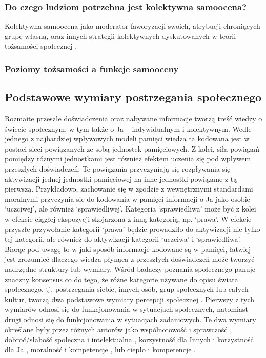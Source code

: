 \documentclass[man]{apa6}
\begin{document}
\subsubsection{Do czego ludziom potrzebna jest kolektywna samoocena?}

Kolektywna samoocena jako moderator faworyzacji swoich, atrybucji chroniących grupę własną, oraz innych strategii kolektywnych dyskutowanych w teorii tożsamości społecznej \parencite{crocker1990collective, luhtanen1992collective}.

\subsubsection{Poziomy tożsamości a funkcje samooceny}



\newpage
\subsection{Podstawowe wymiary postrzegania społecznego}

Rozmaite przeszłe doświadczenia oraz nabywane informacje tworzą treść wiedzy o świecie społecznym, w tym także o Ja -- indywidualnym i kolektywnym. Wedle jednego z najbardziej wpływowych modeli pamięci \parencite{anderson1983spreading} wiedza ta kodowana jest w postaci sieci powiązanych ze sobą jednostek pamięciowych. Z kolei, siła powiązań pomiędzy różnymi jednostkami jest również efektem uczenia się pod wpływem przeszłych doświadczeń. Te powiązania przyczyniają się rozpływania się aktywizacji jednej jednostki pamięciowej na inne jednostki powiązane z tą pierwszą. Przykładowo, zachowanie się w zgodzie z wewnętrznymi standardami moralnymi przyczynia się do kodowania w pamięci informacji o Ja jako osobie `uczciwej', ale również `sprawiedliwej'. Kategoria `sprawiedliwa' może być z kolei w efekcie ciągłej ekspozycji skojarzona z inną kategorią, np. `prawa'. W efekcie przyszłe przywołanie kategorii `prawa' będzie prowadziło do aktywizacji nie tylko tej kategorii, ale również do aktywizacji kategorii `uczciwa' i `sprawiedliwa'.\\

Biorąc pod uwagę to w jaki sposób informacje kodowane są w pamięci, łatwiej jest zrozumieć dlaczego wiedza płynąca z przeszłych doświadczeń może tworzyć nadrzędne struktury lub wymiary. Wśród badaczy poznania społecznego panuje znaczny konsensus co do tego, że różne kategorie używane do opisu świata społecznego, tj. postrzegania siebie, innych osób, grup społecznych lub całych kultur, tworzą dwa podstawowe wymiary percepcji społecznej \parencite{fiske2007universal, judd2005fundamental}. Pierwszy z tych wymiarów odnosi się do funkcjonowania w sytuacjach społecznych, natomiast drugi odnosi się do funkcjonowania w sytuacjach zadaniowych. Te dwa wymiary określane były przez różnych autorów jako wspólnotowość i sprawczość \parencite{abele2007agency}, dobroć/słabość społeczna i intelektualna \parencite {rosenberg1968multidimensional}, korzystność dla Innych i korzystność dla Ja \parencite{peeters1992evaluative}, moralność i kompetencje \parencite{wojciszke2005morality}, lub ciepło i kompetencje \parencite{fiske2002model}.\\
\end{document}

